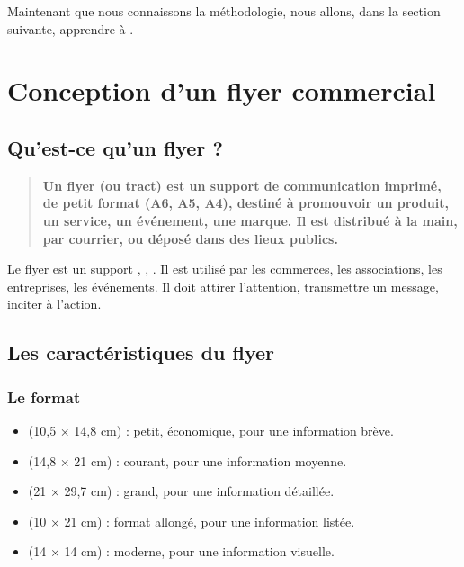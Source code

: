 Maintenant que nous connaissons la méthodologie, nous allons, dans la section suivante, apprendre à .

\section{Conception d'un flyer commercial}

\subsection{Qu'est-ce qu'un flyer ?}

\begin{quote}
\textbf{Un flyer (ou tract) est un support de communication imprimé, de petit format (A6, A5, A4), destiné à promouvoir un produit, un service, un événement, une marque. Il est distribué à la main, par courrier, ou déposé dans des lieux publics.}
\end{quote}

Le flyer est un support , , . Il est utilisé par les commerces, les associations, les entreprises, les événements. Il doit attirer l'attention, transmettre un message, inciter à l'action.

\subsection{Les caractéristiques du flyer}

\subsubsection{Le format}

\begin{itemize}
    \item {} (10,5 × 14,8 cm) : petit, économique, pour une information brève.
    \item {} (14,8 × 21 cm) : courant, pour une information moyenne.
    \item {} (21 × 29,7 cm) : grand, pour une information détaillée.
    \item {} (10 × 21 cm) : format allongé, pour une information listée.
    \item {} (14 × 14 cm) : moderne, pour une information visuelle.
\end{itemize}

